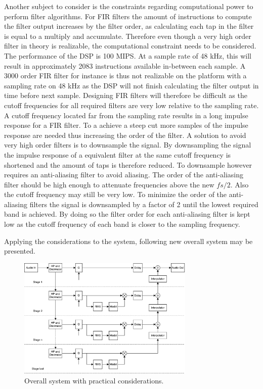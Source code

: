 Another subject to consider is the constraints regarding computational power to perform filter algorithms. For FIR filters the amount of instructions to compute the filter output increases by the filter order, as calculating each tap in the filter is equal to a multiply and accumulate. Therefore even though a very high order filter in theory is realizable, the computational constraint needs to be considered. The performance of the DSP is 100 MIPS. At a sample rate of 48 kHz, this will result in approximately 2083 instructions available in-between each sample. A 3000 order FIR filter for instance is thus not realizable on the platform with a sampling rate on 48 kHz as the DSP will not finish calculating the filter output in time before next sample. Designing FIR filters will therefore be difficult as the cutoff frequencies for all required filters are very low relative to the sampling rate. A cutoff frequency located far from the sampling rate results in a long impulse response for a FIR filter. To a achieve a steep cut more samples of the impulse response are needed thus increasing the order of the filter. A solution to avoid very high order filters is to downsample the signal. By downsampling the signal the impulse response of a equivalent filter at the same cutoff frequency is shortened and the amount of taps is therefore reduced. To downsample however requires an anti-aliasing filter to avoid aliasing. The order of the anti-aliasing filter should be high enough to attenuate frequencies above the new $fs/2$. Also the cutoff frequency may still be very low. To minimize the order of the anti-aliasing filters the signal is  downsampled by a factor of 2 until the lowest required band is achieved. By doing so the filter order for each anti-aliasing filter is kept low as the cutoff frequency of each band is closer to the sampling frequency.

Applying the considerations to the system, following new overall system may be presented.

\begin{figure}[H]
\centering
\includegraphics[width=0.75\textwidth]{figures/designRealBlock1.pdf}
\caption{Overall system with practical considerations.}
\label{fig:designRealBlock}
\end{figure}

